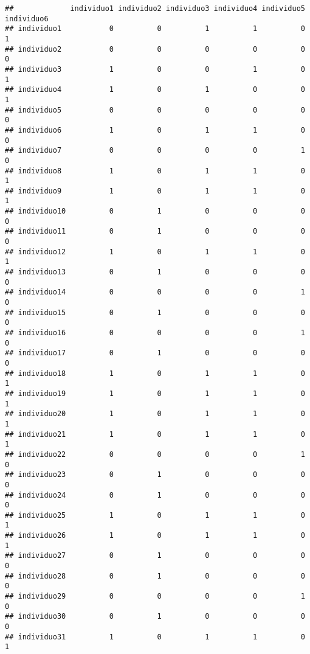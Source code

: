 \documentclass[
]{article}
\begin{document}
\begin{verbatim}
##             individuo1 individuo2 individuo3 individuo4 individuo5 individuo6
## individuo1           0          0          1          1          0          1
## individuo2           0          0          0          0          0          0
## individuo3           1          0          0          1          0          1
## individuo4           1          0          1          0          0          1
## individuo5           0          0          0          0          0          0
## individuo6           1          0          1          1          0          0
## individuo7           0          0          0          0          1          0
## individuo8           1          0          1          1          0          1
## individuo9           1          0          1          1          0          1
## individuo10          0          1          0          0          0          0
## individuo11          0          1          0          0          0          0
## individuo12          1          0          1          1          0          1
## individuo13          0          1          0          0          0          0
## individuo14          0          0          0          0          1          0
## individuo15          0          1          0          0          0          0
## individuo16          0          0          0          0          1          0
## individuo17          0          1          0          0          0          0
## individuo18          1          0          1          1          0          1
## individuo19          1          0          1          1          0          1
## individuo20          1          0          1          1          0          1
## individuo21          1          0          1          1          0          1
## individuo22          0          0          0          0          1          0
## individuo23          0          1          0          0          0          0
## individuo24          0          1          0          0          0          0
## individuo25          1          0          1          1          0          1
## individuo26          1          0          1          1          0          1
## individuo27          0          1          0          0          0          0
## individuo28          0          1          0          0          0          0
## individuo29          0          0          0          0          1          0
## individuo30          0          1          0          0          0          0
## individuo31          1          0          1          1          0          1

\end{verbatim}
\end{document}
